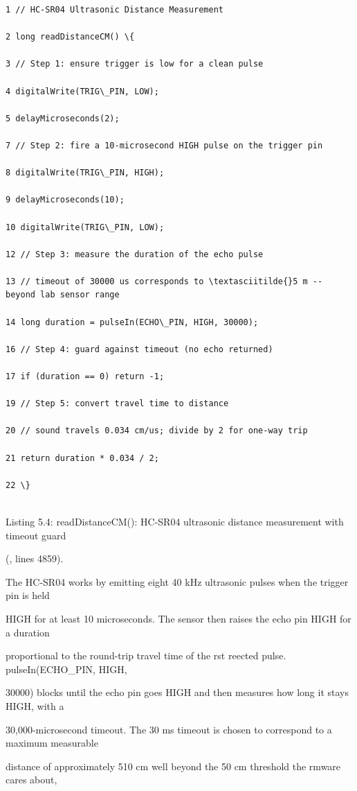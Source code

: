 \begin{listingbox}
	\begin{verbatim}
1 // HC-SR04 Ultrasonic Distance Measurement

2 long readDistanceCM() \{

3 // Step 1: ensure trigger is low for a clean pulse

4 digitalWrite(TRIG\_PIN, LOW);

5 delayMicroseconds(2);

7 // Step 2: fire a 10-microsecond HIGH pulse on the trigger pin

8 digitalWrite(TRIG\_PIN, HIGH);

9 delayMicroseconds(10);

10 digitalWrite(TRIG\_PIN, LOW);

12 // Step 3: measure the duration of the echo pulse

13 // timeout of 30000 us corresponds to \textasciitilde{}5 m -- beyond lab sensor range

14 long duration = pulseIn(ECHO\_PIN, HIGH, 30000);

16 // Step 4: guard against timeout (no echo returned)

17 if (duration == 0) return -1;

19 // Step 5: convert travel time to distance

20 // sound travels 0.034 cm/us; divide by 2 for one-way trip

21 return duration * 0.034 / 2;

22 \}


\end{verbatim}
\end{listingbox}
Listing 5.4: readDistanceCM(): HC-SR04 ultrasonic distance measurement with timeout guard

(, lines 4859).

The HC-SR04 works by emitting eight 40 kHz ultrasonic pulses when the trigger pin is held

HIGH for at least 10 microseconds. The sensor then raises the echo pin HIGH for a duration

proportional to the round-trip travel time of the rst reected pulse. pulseIn(ECHO\_PIN, HIGH,

30000) blocks until the echo pin goes HIGH and then measures how long it stays HIGH, with a

30,000-microsecond timeout. The 30 ms timeout is chosen to correspond to a maximum measurable

distance of approximately 510 cm  well beyond the 50 cm threshold the rmware cares about,


